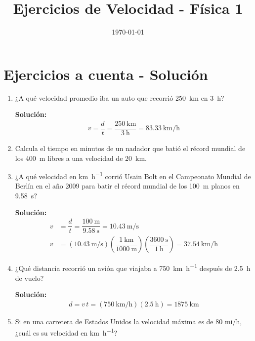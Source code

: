 \documentclass[14pt]{extarticle}
\title{\vspace*{-2cm} Ejercicios de Velocidad - Física 1\vspace{-5ex}}
\date{\today}
\begin{document}
\maketitle

\section{Ejercicios a cuenta - Solución}

\begin{enumerate}
\item ¿A qué velocidad promedio iba un auto que recorrió \SI{250}{\kilo\meter} en \SI{3}{\hour}?

\textbf{Solución:}
\begin{align*}
v = \dfrac{d}{t} = \dfrac{\SI{250}{\kilo\meter}}{\SI{3}{\hour}} = \SI{83.33}{\kilo\meter\per\hour}
\end{align*}
\item Calcula el tiempo en minutos de un nadador que batió el récord mundial de los \SI{400}{\meter} libres a una velocidad de \SI{20}{\kilo\meter}.
\item ¿A qué velocidad en \unit{\kilo\meter\per\hour} corrió Usain Bolt en el Campeonato Mundial de Berlín en el año 2009 para batir el récord mundial de los \SI{100}{\meter} planos en \SI{9.58}{\second}?

\textbf{Solución:}
\begin{align*}
v &= \dfrac{d}{t} = \dfrac{\SI{100}{\meter}}{\SI{9.58}{\second}} = \SI{10.43}{\meter\per\second} \\[0.5em]
v &= \left( \SI[per-mode=fraction]{10.43}{\meter\per\second} \right) \left( \dfrac{\SI{1}{\kilo\meter}}{\SI{1000}{\meter}} \right) \left( \dfrac{\SI{3600}{\second}}{\SI{1}{\hour}} \right) = \SI[per-mode=fraction]{37.54}{\kilo\meter\per\hour}
\end{align*}

\item ¿Qué distancia recorrió un avión que viajaba a \SI{750}{\kilo\meter\per\hour} después de \SI{2.5}{\hour} de vuelo?

\textbf{Solución:}
\begin{align*}
d = v \, t = \left( \SI[per-mode=fraction]{750}{\kilo\meter\per\hour} \right) \left( \SI{2.5}{\hour} \right) = \SI{1875}{\kilo\meter}
\end{align*}
\item Si en una carretera de Estados Unidos la velocidad máxima es de $80$ mi/\unit{\hour}, ¿cuál es su velocidad en \unit{\kilo\meter\per\hour}?


\end{enumerate}
\end{document}
